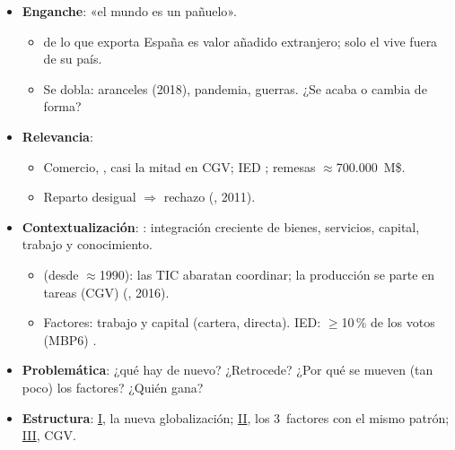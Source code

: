 \documentclass{article}
\begin{document}
\cabecerarepaso
\begin{columnas}

\begin{itemize}
\item \textbf{Enganche}: «el mundo es un pañuelo».
  \begin{itemize}
  \item {} de lo que exporta España es valor añadido extranjero; solo el  vive fuera de su país.
  \item Se dobla: aranceles (2018), pandemia, guerras. ¿Se acaba o cambia de forma?
  \end{itemize}
\item \textbf{Relevancia}:
  \begin{itemize}
  \item Comercio, , casi la mitad en CGV; IED ; remesas $\approx$700.000~M\$.
  \item Reparto desigual $\Rightarrow$ rechazo (, 2011).
  \end{itemize}
\item \textbf{Contextualización}: : integración creciente de bienes, servicios, capital, trabajo y conocimiento.
  \begin{itemize}
  \item {} (desde $\approx$1990): las TIC abaratan coordinar; la producción se parte en tareas (CGV) (, 2016).
  \item Factores: trabajo y capital (cartera, directa). IED: $\geq$10\,\% de los votos (MBP6) .
  \end{itemize}
\item \textbf{Problemática}: ¿qué hay de nuevo? ¿Retrocede? ¿Por qué se mueven (tan poco) los factores? ¿Quién gana?
\item \textbf{Estructura}: \hyperref[rep:I]{I}, la nueva globalización; \hyperref[rep:II]{II}, los 3~factores con el mismo patrón; \hyperref[rep:III]{III}, CGV.
\end{itemize}


\end{columnas}
\end{document}
